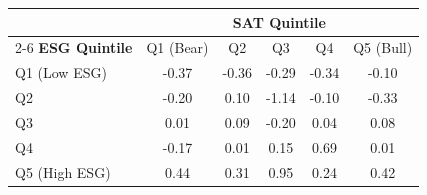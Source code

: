 \begin{tabular}{lccccc}
\toprule
& \multicolumn{5}{c}{\textbf{SAT Quintile}} \\
\cmidrule(lr){2-6}
\textbf{ESG Quintile} & Q1 (Bear) & Q2 & Q3 & Q4 & Q5 (Bull) \\
\midrule
Q1 (Low ESG) & -0.37 & -0.36 & -0.29 & -0.34 & -0.10 \\
Q2 & -0.20 & 0.10 & -1.14 & -0.10 & -0.33 \\
Q3 & 0.01 & 0.09 & -0.20 & 0.04 & 0.08 \\
Q4 & -0.17 & 0.01 & 0.15 & 0.69 & 0.01 \\
Q5 (High ESG) & 0.44 & 0.31 & 0.95 & 0.24 & 0.42 \\
\bottomrule
\end{tabular}